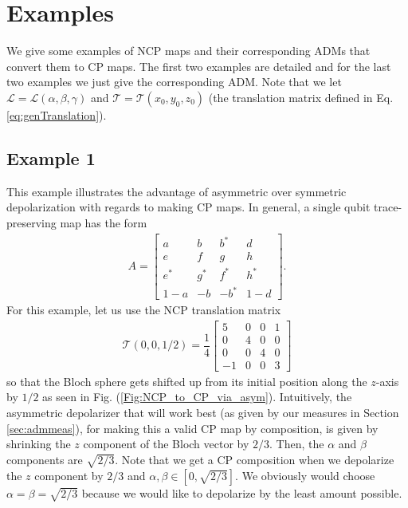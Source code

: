 \documentclass[12pt]{iopart}
\begin{document}
\section{Examples}
We give some examples of NCP maps and their corresponding ADMs that convert them to CP maps. The first two examples are detailed and for the last two examples we just give the corresponding ADM. Note that we let $\mathcal{L}=\mathcal{L}(\alpha,\beta,\gamma)$ and $\mathcal{T}=\mathcal{T}(x_0,y_0,z_0)$ (the translation matrix defined in Eq. \eqref{eq:genTranslation}).

\subsection{Example 1}
This example illustrates the advantage of asymmetric over symmetric depolarization with regards to making CP maps. In general, a single qubit trace-preserving map has the form \cite{sudarshan_1961}
\begin{align}
    A = 
    \left[
    \begin{array}{cccc}
     a & b & b^* & d  \\
     e & f & g & h \\
     e^* & g^* & f^* & h^* \\
     1-a & -b & -b^* & 1-d
    \end{array}
    \right].
\end{align}
For this example, let us use the NCP translation matrix
\begin{align}
    \mathcal{T}(0, 0, 1/2) = \dfrac{1}{4}
    \left[
    \begin{array}{cccc}
     5 & 0 & 0 & 1 \\
     0 & 4 & 0 & 0 \\
     0 & 0 & 4 & 0 \\
     -1 & 0 & 0 & 3 
    \end{array}
    \right]
\end{align}
so that the Bloch sphere gets shifted up from its initial position along the $z$-axis by $1/2$ as seen in Fig. (\ref{Fig:NCP_to_CP_via_asym}). 
Intuitively, the asymmetric depolarizer that will work best (as given by our measures in Section \ref{sec:admmeas}), for making this a valid CP map by composition, is given by shrinking the $z$ component of the Bloch vector by $2/3$. Then, the $\alpha$ and $\beta$ components are $\sqrt{2/3}$. Note that we get a CP composition when we depolarize the $z$ component by $2/3$ and $\alpha,\beta \in [0,\sqrt{2/3}]$. We obviously would choose $\alpha=\beta=\sqrt{2/3}$ because we would like to depolarize by the least amount possible. 
\end{document}
